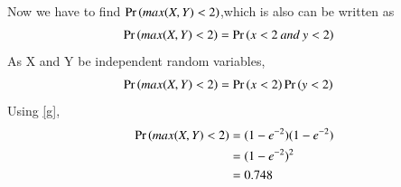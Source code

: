 \documentclass[journal,12pt,twocolumn]{IEEEtran}
\begin{document}
Now we have to find $\Pr\left( max(X,Y)<2\right)$,which is also can be written as
\begin{align}
   \Pr\left(max(X,Y)<2\right) &=\Pr\left(x<2\: and \:y<2\right)
\end{align}
As X and Y be independent random variables,
\begin{align}
   \Pr\left(max(X,Y)<2\right) &=\Pr\left(x<2\right)\Pr\left(y<2\right) \label{k}
\end{align}
Using  \eqref{g},
\begin{align}
\Pr\left(max(X,Y)<2\right) &=(1 -e^{-2})(1 -e^{-2})\\
&= (1 -e^{-2})^{2}\\
   &=0.748
\end{align}
\end{document}
